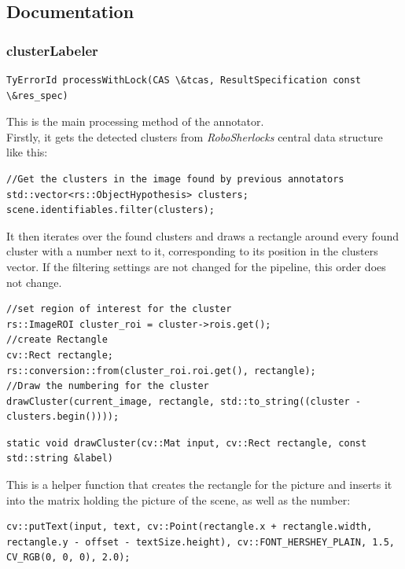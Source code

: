 \documentclass[main.tex]{subfiles}
\begin{document}
\subsection{Documentation}
\subsubsection{clusterLabeler}
\begin{lstlisting}
TyErrorId processWithLock(CAS \&tcas, ResultSpecification const \&res_spec)
\end{lstlisting}
This is the main processing method of the annotator.\\

Firstly, it gets the detected clusters from \textit{RoboSherlocks} central data structure like this: \label{getting the detected clusters.}

\begin{lstlisting}
//Get the clusters in the image found by previous annotators
std::vector<rs::ObjectHypothesis> clusters;
scene.identifiables.filter(clusters);
\end{lstlisting}

It then iterates over the found clusters and draws a rectangle around every found cluster with a number next to it, corresponding to its position in the clusters vector. If the filtering settings are not changed for the pipeline, this order does not change.

\begin{lstlisting}
//set region of interest for the cluster
rs::ImageROI cluster_roi = cluster->rois.get();
//create Rectangle
cv::Rect rectangle;
rs::conversion::from(cluster_roi.roi.get(), rectangle);
//Draw the numbering for the cluster
drawCluster(current_image, rectangle, std::to_string((cluster - clusters.begin())));
\end{lstlisting}

\begin{lstlisting}
static void drawCluster(cv::Mat input, cv::Rect rectangle, const std::string &label)
\end{lstlisting}

This is a helper function that creates the rectangle for the picture and inserts it into the matrix holding the picture of the scene, as well as the number:

\begin{lstlisting}
cv::putText(input, text, cv::Point(rectangle.x + rectangle.width, rectangle.y - offset - textSize.height), cv::FONT_HERSHEY_PLAIN, 1.5, CV_RGB(0, 0, 0), 2.0);
\end{lstlisting}
\end{document}
